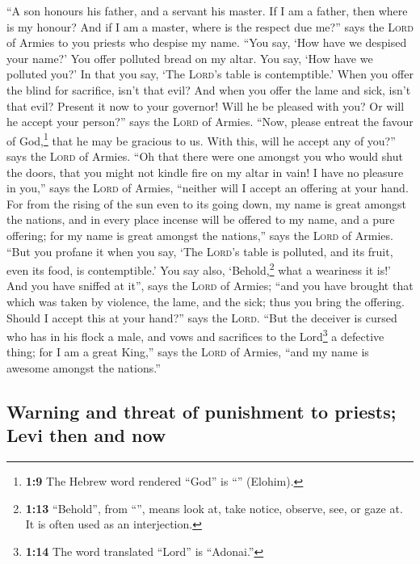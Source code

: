  ``A son honours his father, and a servant his master. If
I am a father, then where is my honour? And if I am a master, where is
the respect due me?'' says the \textsc{Lord} of Armies to you priests
who despise my name. ``You say, `How have we despised your name?'
 You offer polluted bread on my altar. You say, `How have
we polluted you?' In that you say, `The \textsc{Lord}'s table is
contemptible.'  When you offer the blind for sacrifice,
isn't that evil? And when you offer the lame and sick, isn't that evil?
Present it now to your governor! Will he be pleased with you? Or will he
accept your person?'' says the \textsc{Lord} of Armies. 
``Now, please entreat the favour of God,\footnote{\textbf{1:9} The
  Hebrew word rendered ``God'' is ``'' (Elohim).} that he
may be gracious to us. With this, will he accept any of you?'' says the
\textsc{Lord} of Armies.  ``Oh that there were one
amongst you who would shut the doors, that you might not kindle fire on
my altar in vain! I have no pleasure in you,'' says the \textsc{Lord} of
Armies, ``neither will I accept an offering at your hand.
 For from the rising of the sun even to its going down,
my name is great amongst the nations, and in every place incense will be
offered to my name, and a pure offering; for my name is great amongst
the nations,'' says the \textsc{Lord} of Armies.  ``But
you profane it when you say, `The \textsc{Lord}'s table is polluted, and
its fruit, even its food, is contemptible.'  You say
also, `Behold,\footnote{\textbf{1:13} ``Behold'', from ``'',
  means look at, take notice, observe, see, or gaze at. It is often used
  as an interjection.} what a weariness it is!' And you have sniffed at
it'', says the \textsc{Lord} of Armies; ``and you have brought that
which was taken by violence, the lame, and the sick; thus you bring the
offering. Should I accept this at your hand?'' says the \textsc{Lord}.
 ``But the deceiver is cursed who has in his flock a
male, and vows and sacrifices to the Lord\footnote{\textbf{1:14} The
  word translated ``Lord'' is ``Adonai.''} a defective thing; for I am a
great King,'' says the \textsc{Lord} of Armies, ``and my name is awesome
amongst the nations.''

\hypertarget{warning-and-threat-of-punishment-to-priests-levi-then-and-now}{%
\subsection{Warning and threat of punishment to priests; Levi then and
now}\label{warning-and-threat-of-punishment-to-priests-levi-then-and-now}}

